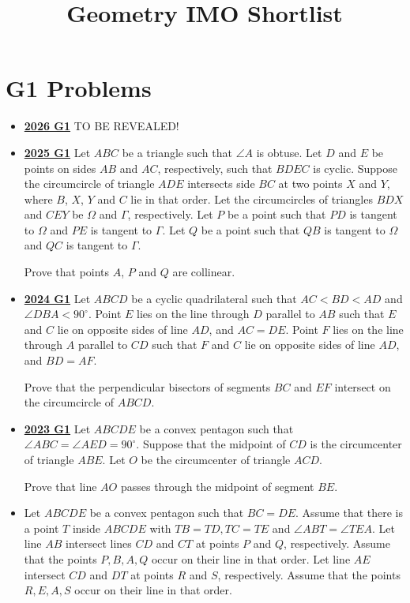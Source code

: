 \documentclass[11pt]{scrartcl}
\begin{document}
\title{Geometry IMO Shortlist}
 
\section*{G1 Problems}  \label{G1}
\begin{itemize}[leftmargin=*]


\item \href{https://www.imo-official.org/assets/documents/problems/2026/IMO2026SL.pdf}{\textbf{2026 G1}} TO BE REVEALED!

\item \href{https://artofproblemsolving.com/community/c6h3866857p38676945}{\textbf{2025 G1}} Let $ABC$ be a triangle such that $\angle A$ is obtuse. Let $D$ and $E$ be points on sides $AB$ and $AC$, respectively, such that $BDEC$ is cyclic. Suppose the circumcircle of triangle $ADE$ intersects side $BC$ at two points $X$ and $Y$, where $B$, $X$, $Y$ and $C$ lie in that order. Let the circumcircles of triangles $BDX$ and $CEY$ be $\Omega$ and $\Gamma$, respectively. Let $P$ be a point such that $PD$ is tangent to $\Omega$ and $PE$ is tangent to $\Gamma$. Let $Q$ be a point such that $QB$ is tangent to $\Omega$ and $QC$ is tangent to $\Gamma$. 
    
    Prove that points $A$, $P$ and $Q$ are collinear.
\item \href{https://artofproblemsolving.com/community/c6h3610481p35341119}{\textbf{2024 G1}} Let $ABCD$ be a cyclic quadrilateral such that $AC<BD<AD$ and $\angle DBA<90^\circ$. Point $E$ lies on the line through $D$ parallel to $AB$ such that $E$ and $C$ lie on opposite sides of line $AD$, and $AC=DE$. Point $F$ lies on the line through $A$ parallel to $CD$ such that $F$ and $C$ lie on opposite sides of line $AD$, and $BD=AF$.

Prove that the perpendicular bisectors of segments $BC$ and $EF$ intersect on the circumcircle of $ABCD$.
\item \href{https://artofproblemsolving.com/community/c6h3359760p31218557}{\textbf{2023 G1}} Let $ABCDE$ be a convex pentagon such that $\angle ABC = \angle AED = 90^\circ$. Suppose that the midpoint of $CD$ is the circumcenter of triangle $ABE$. Let $O$ be the circumcenter of triangle $ACD$.

Prove that line $AO$ passes through the midpoint of segment $BE$.
    \item {}  Let $ABCDE$ be a convex pentagon such that $BC=DE$. Assume that there is a point $T$ inside $ABCDE$ with $TB=TD,TC=TE$ and $\angle ABT = \angle TEA$. Let line $AB$ intersect lines $CD$ and $CT$ at points $P$ and $Q$, respectively. Assume that the points $P,B,A,Q$ occur on their line in that order. Let line $AE$ intersect $CD$ and $DT$ at points $R$ and $S$, respectively. Assume that the points $R,E,A,S$ occur on their line in that order. 
    

\end{itemize}
\end{document}
